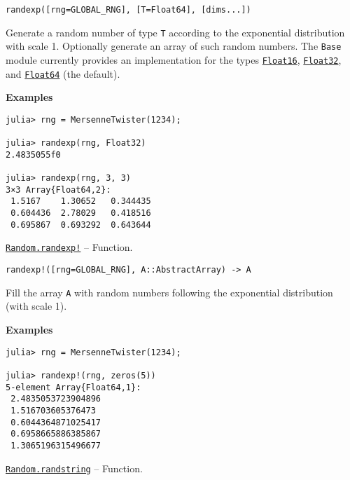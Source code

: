 \begin{adjustwidth}{2em}{0pt}


\begin{verbatim}
randexp([rng=GLOBAL_RNG], [T=Float64], [dims...])
\end{verbatim}

Generate a random number of type \texttt{T} according to the exponential distribution with scale 1. Optionally generate an array of such random numbers. The \texttt{Base} module currently provides an implementation for the types \hyperlink{2727296760866702904}{\texttt{Float16}}, \hyperlink{8101639384272933082}{\texttt{Float32}}, and \hyperlink{5027751419500983000}{\texttt{Float64}} (the default).

\textbf{Examples}


\begin{verbatim}
julia> rng = MersenneTwister(1234);

julia> randexp(rng, Float32)
2.4835055f0

julia> randexp(rng, 3, 3)
3×3 Array{Float64,2}:
 1.5167    1.30652   0.344435
 0.604436  2.78029   0.418516
 0.695867  0.693292  0.643644
\end{verbatim}



\end{adjustwidth}
\hypertarget{3451932378818354751}{} 
\hyperlink{3451932378818354751}{\texttt{Random.randexp!}}  -- {Function.}

\begin{adjustwidth}{2em}{0pt}


\begin{verbatim}
randexp!([rng=GLOBAL_RNG], A::AbstractArray) -> A
\end{verbatim}

Fill the array \texttt{A} with random numbers following the exponential distribution (with scale 1).

\textbf{Examples}


\begin{verbatim}
julia> rng = MersenneTwister(1234);

julia> randexp!(rng, zeros(5))
5-element Array{Float64,1}:
 2.4835053723904896
 1.516703605376473
 0.6044364871025417
 0.6958665886385867
 1.3065196315496677
\end{verbatim}



\end{adjustwidth}
\hypertarget{3465524779478434258}{} 
\hyperlink{3465524779478434258}{\texttt{Random.randstring}}  -- {Function.}

